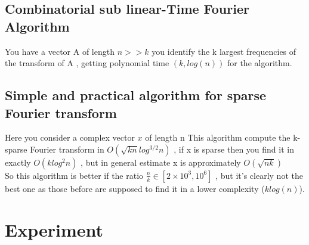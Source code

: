 \documentclass{article}
\begin{document}
\subsection{Combinatorial sub linear-Time Fourier Algorithm}
You have a vector A of length $n >> k$ you identify the k largest frequencies of the transform of A , getting polynomial time $(k,log(n))$ for the algorithm.\\

\subsection{Simple and practical algorithm for sparse Fourier transform}
Here you consider a complex vector $x$ of length n
This algorithm compute the k-sparse Fourier transform in $O(\sqrt{kn}log^{3/2}n)$ , if x is sparse then you find it in exactly $O(klog^{2}n)$ , but in general estimate x is approximately $O(\sqrt{nk})$\\
So this algorithm is better if the ratio $\frac{n}{k} \in [2 \times 10^3 , 10^6]$ , but it's clearly not the best one as those before are supposed to find it in a lower complexity ($klog(n)$).\\

\section{Experiment}
\end{document}
